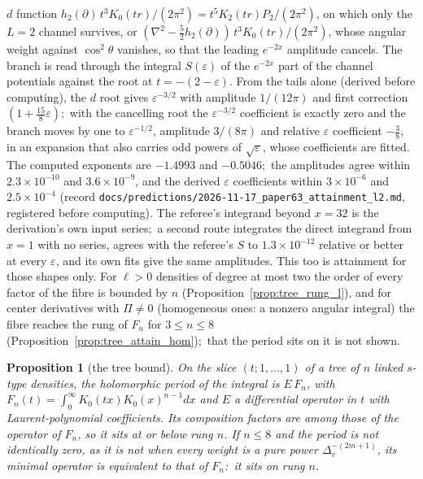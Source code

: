 \documentclass[aps,pra,twocolumn,superscriptaddress,longbibliography]{revtex4-2}
\newtheorem{proposition}{Proposition}
\begin{document}
$d$ function $h_2(\partial)\,t^3K_0(tr)/(2\pi^2)=t^5K_2(tr)P_2/(2\pi^2)$, on
which only the $L=2$ channel survives, or
$(\nabla^2-\tfrac52h_2(\partial))\,t^3K_0(tr)/(2\pi^2)$, whose angular weight
against $\cos^2\theta$ vanishes, so that the leading $e^{-2x}$ amplitude
cancels.  The branch is read through the integral $S(\varepsilon)$ of the
$e^{-2x}$ part of the channel potentials against the root at
$t=-(2-\varepsilon)$.  From the tails alone (derived before computing), the
$d$ root gives $\varepsilon^{-3/2}$ with amplitude $1/(12\pi)$ and first
correction $(1+\tfrac{15}{8}\varepsilon)$;\ with the cancelling root the
$\varepsilon^{-3/2}$ coefficient is exactly zero and the branch moves by one
to $\varepsilon^{-1/2}$, amplitude $3/(8\pi)$ and relative $\varepsilon$
coefficient $-\tfrac38$, in an expansion that also carries odd powers of
$\sqrt\varepsilon$, whose coefficients are fitted.  The computed exponents are $-1.4993$ and $-0.5046$;\ the
amplitudes agree within $2.3\times10^{-10}$ and $3.6\times10^{-9}$, and the
derived $\varepsilon$ coefficients within $3\times10^{-6}$ and $2.5\times10^{-4}$ (record
\texttt{docs/predictions/2026-11-17\_paper63\_attainment\_l2.md}, registered
before computing).  The referee's integrand beyond $x=32$ is the derivation's
own input series;\ a second route integrates the direct integrand from $x=1$
with no series, agrees with the referee's $S$ to $1.3\times10^{-12}$ relative
or better at every $\varepsilon$, and its own fits give the same amplitudes.  This too is
attainment for those shapes only.  For $\ell>0$ densities of degree at
most two the order of every factor of the fibre is bounded by $n$
(Proposition~\ref{prop:tree_rung_l}), and for center derivatives with $\Pi\neq0$ (homogeneous ones: a
nonzero angular integral) the fibre reaches the rung of $F_n$ for $3\le n\le8$
(Proposition~\ref{prop:tree_attain_hom});\ that the period sits on it is not shown.

\begin{proposition}[the tree bound]
\label{prop:tree_bound}
On the slice $(t;1,\dots,1)$ of a tree of $n$ linked $s$-type densities, the
holomorphic period of the integral is $E\,F_n$, with
$F_n(t)=\int_0^\infty K_0(tx)K_0(x)^{n-1}dx$ and $E$ a differential operator in
$t$ with Laurent-polynomial coefficients.  Its composition factors are among
those of the operator of $F_n$, so it sits at or below rung $n$.  If
$n\le8$ and the period is not identically zero, as it is not when every
weight is a pure power $\Delta_v^{-(2m+1)}$, its minimal operator is
equivalent to that of $F_n$:\ it sits on rung $n$.
\end{proposition}
\end{document}
